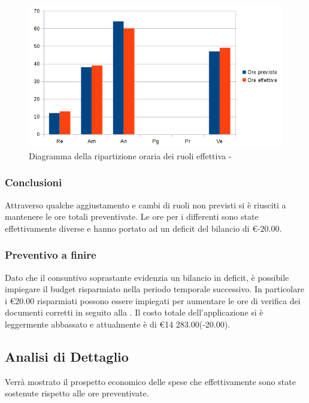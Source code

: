 \documentclass[12pt,a4paper]{article}
\begin{document}
\begin{center}
	\begin{figure}[H]
		\centering
		\includegraphics[width=\textwidth]{../img/diagrammaBarreAnalisiConsuntivo.png}
		\caption{Diagramma della ripartizione oraria dei ruoli effettiva - \FA{}}
	\end{figure}
\end{center}

\subsubsection{Conclusioni}
Attraverso qualche aggiustamento e cambi di ruoli non previsti si è riusciti a mantenere le ore totali preventivate. Le ore per i differenti  sono state effettivamente diverse e hanno portato ad un deficit del bilancio di \euro{}-20.00.

\subsubsection{Preventivo a finire}
\label{sec:paf-analisi}
Dato che il consuntivo soprastante evidenzia un bilancio in deficit, è possibile impiegare il budget risparmiato nella periodo temporale successivo. In particolare i \euro{}20.00 risparmiati possono essere impiegati per aumentare le ore di verifica dei documenti corretti in seguito alla \RR{}. Il costo totale dell'applicazione si è leggermente abbassato e attualmente è di \euro{}14 283.00(-20.00).

\newpage

\subsection{Analisi di Dettaglio}
Verrà mostrato il prospetto economico delle spese che effettivamente sono state sostenute rispetto alle ore preventivate.
\end{document}
